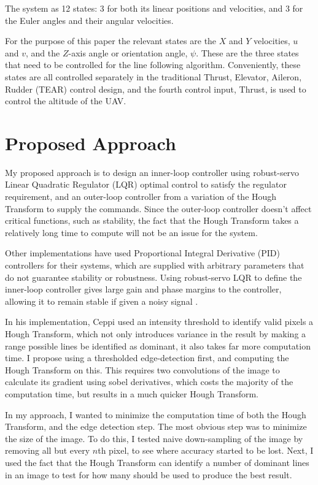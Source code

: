 \documentclass[10pt,twocolumn,letterpaper]{article}
\begin{document}
		The system as 12 states: 3 for both its linear positions and velocities, and 3 for the Euler angles and their angular velocities. 
		
		For the purpose of this paper the relevant states are the $X$ and $Y$ velocities, $u$ and $v$, and the $Z$-axis angle or orientation angle, $\psi$. These are the three states that need to be controlled for the line following algorithm. Conveniently, these states are all controlled separately in the traditional Thrust, Elevator, Aileron, Rudder (TEAR) control design, and the fourth control input, Thrust, is used to control the altitude of the UAV.  
		

	\section{Proposed Approach}

	My proposed approach is to design an inner-loop controller using robust-servo Linear Quadratic Regulator (LQR) optimal control to satisfy the regulator requirement, and an outer-loop controller from a variation of the Hough Transform to supply the commands. Since the outer-loop controller doesn't affect critical functions, such as stability, the fact that the Hough Transform takes a relatively long time to compute will not be an issue for the system. 
	
	Other implementations have used Proportional Integral Derivative (PID) controllers for their systems, which are supplied with arbitrary parameters that do not guarantee stability or robustness. Using robust-servo LQR to define the inner-loop controller gives large gain and phase margins to the controller, allowing it to remain stable if given a noisy signal \cite{wise}. 
	
	In his implementation, Ceppi used an intensity threshold to identify valid pixels a Hough Transform, which not only introduces variance in the result by making a range possible lines be identified as dominant, it also takes far more computation time. I propose using a thresholded edge-detection first, and computing the Hough Transform on this. This requires two convolutions of the image to calculate its gradient using sobel derivatives, which costs the majority of the computation time, but results in a much quicker Hough Transform. 
	
	In my approach, I wanted to minimize the computation time of both the Hough Transform, and the edge detection step. The most obvious step was to minimize the size of the image. To do this, I tested naive down-sampling of the image by removing all but every $n$th pixel, to see where accuracy started to be lost. Next, I used the fact that the Hough Transform can identify a number of dominant lines in an image to test for how many should be used to produce the best result.
	
\end{document}
